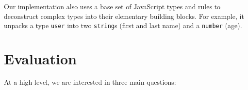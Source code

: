 \documentclass[letterpaper,twocolumn,10pt]{article}
\newcommand{\ttt}[1]{\texttt{#1}}
\newcommand{\sys}{{\scshape Lya}\xspace}
\begin{document}
Our implementation also uses a base set of JavaScript types and rules to deconstruct complex types into their elementary building blocks.
For example, it unpacks a type \ttt{user} into two \ttt{string}s (first and last name) and a \ttt{number} (age).


% 

\section{Evaluation}
\label{eval}

At a high level, we are interested in three main questions:
\end{document}

